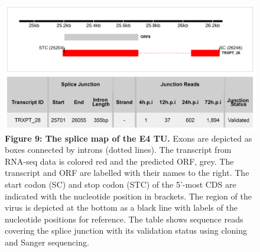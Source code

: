 \documentclass[
]{article}
\begin{document}
\begin{figure}
\centering
\includegraphics{results/r/figures/figure_9.png}
\caption{\textbf{Figure 9: The splice map of the E4 TU.} Exons are
depicted as boxes connected by introns (dotted lines). The transcript
from RNA-seq data is colored red and the predicted ORF, grey. The
transcript and ORF are labelled with their names to the right. The start
codon (SC) and stop codon (STC) of the 5'-most CDS are indicated with
the nucleotide position in brackets. The region of the virus is depicted
at the bottom as a black line with labels of the nucleotide positions
for reference. The table shows sequence reads covering the splice
junction with its validation status using cloning and Sanger
sequencing.}
\end{figure}

\newpage
\end{document}
